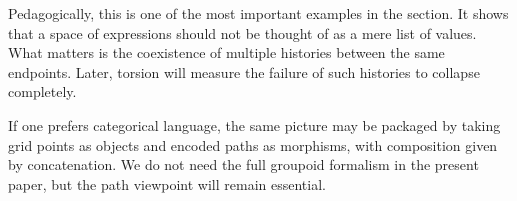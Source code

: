 Pedagogically, this is one of the most important examples in the section. It shows that a space of expressions should not be thought of as a mere list of values. What matters is the coexistence of multiple histories between the same endpoints. Later, torsion will measure the failure of such histories to collapse completely.

If one prefers categorical language, the same picture may be packaged by taking grid points as objects and encoded paths as morphisms, with composition given by concatenation. We do not need the full groupoid formalism in the present paper, but the path viewpoint will remain essential.
